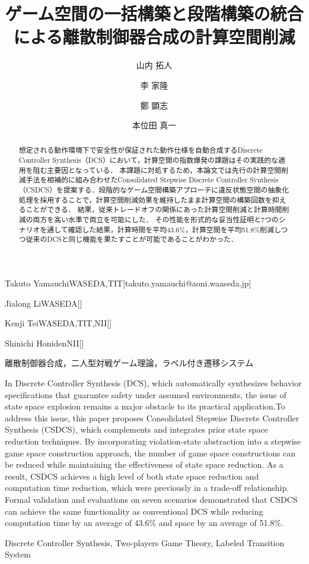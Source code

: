 \documentclass[submit]{ipsj}
\begin{document}
\title{ゲーム空間の一括構築と段階構築の統合による離散制御器合成の計算空間削減}



\author{山内 拓人}{Takuto Yamauchi}{WASEDA,TIT}[takuto.yamauchi@aoni.waaseda.jp]
\author{李 家隆}{Jialong Li}{WASEDA}[]
\author{鄭 顕志}{Kenji Tei}{WASEDA,TIT,NII}[]
\author{本位田 真一}{Shinichi Honiden}{NII}[]

\begin{abstract}
想定される動作環境下で安全性が保証された動作仕様を自動合成するDiscrete Controller Synthesis（DCS）において，計算空間の指数爆発の課題はその実践的な適用を阻む主要因となっている．
本課題に対処するため，本論文では先行の計算空間削減手法を相補的に組み合わせたConsolidated Stepwise Discrete Controller Synthesis（CSDCS）を提案する．段階的なゲーム空間構築アプローチに違反状態空間の抽象化処理を採用することで，計算空間削減効果を維持したまま計算空間の構築回数を抑えることができる．
結果，従来トレードオフの関係にあった計算空間削減と計算時間削減の両方を高い水準で両立を可能にした．
その性能を形式的な妥当性証明と7つのシナリオを通して確認した結果，計算時間を平均43.6\%，計算空間を平均51.8\%削減しつつ従来のDCSと同じ機能を果たすことが可能であることがわかった．
\end{abstract}
\begin{jkeyword}
離散制御器合成，二人型対戦ゲーム理論，ラベル付き遷移システム
\end{jkeyword}


\begin{eabstract}
In Discrete Controller Synthesis (DCS), which automatically synthesizes behavior specifications that guarantee safety under assumed environments, the issue of state space explosion remains a major obstacle to its practical application.To address this issue, this paper proposes Consolidated Stepwise Discrete Controller Synthesis (CSDCS), which complements and integrates prior state space reduction techniques. By incorporating violation-state abstraction into a stepwise game space construction approach, the number of game space constructions can be reduced while maintaining the effectiveness of state space reduction. As a result, CSDCS achieves a high level of both state space reduction and computation time reduction, which were previously in a trade-off relationship. Formal validation and evaluations on seven scenarios demonstrated that CSDCS can achieve the same functionality as conventional DCS while reducing computation time by an average of 43.6\% and space by an average of 51.8\%.
\end{eabstract}
\begin{ekeyword}
Discrete Controller Synthesis, Two-players Game Theory, Labeled Transition System
\end{ekeyword}
\end{document}
